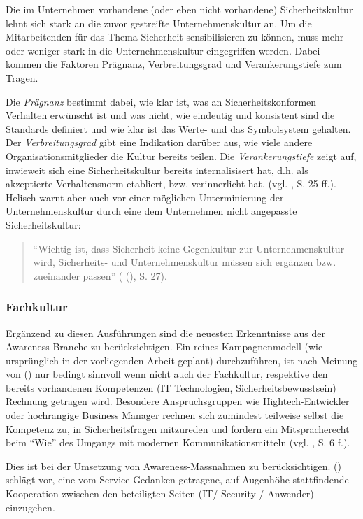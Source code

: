 \documentclass[../../main.tex]{subfiles}
\begin{document}
\begin{sloppypar}
Die im Unternehmen vorhandene (oder eben nicht vorhandene) Sicherheitskultur lehnt sich stark an die zuvor gestreifte Unternehmenskultur an. Um die Mitarbeitenden für das Thema Sicherheit sensibilisieren zu können, muss mehr oder weniger stark in die Unternehmenskultur eingegriffen werden. Dabei kommen die Faktoren Prägnanz, Verbreitungsgrad und Verankerungstiefe zum Tragen.

Die \textit{Prägnanz} bestimmt dabei, wie klar ist, was an Sicherheitskonformen Verhalten erwünscht ist und was nicht, wie eindeutig und konsistent sind die Standards definiert und wie klar ist das Werte- und das Symbolsystem gehalten. Der \textit{Verbreitungsgrad} gibt eine Indikation darüber aus, wie viele andere Organisationsmitglieder die Kultur bereits teilen. Die \textit{Verankerungstiefe} zeigt auf, inwieweit sich eine Sicherheitskultur bereits internalisisert hat, d.h. als akzeptierte Verhaltensnorm etabliert, bzw. verinnerlicht hat. (vgl. \citeauthor{helisch_security_2009} \citeyear{helisch_security_2009}, S. 25 ff.). Helisch warnt aber auch vor einer möglichen Unterminierung der Unternehmenskultur durch eine dem Unternehmen nicht angepasste Sicherheitskultur:

\begin{quote}
"`Wichtig ist, dass Sicherheit keine Gegenkultur zur Unternehmenskultur wird, Sicherheits- und Unternehmenskultur müssen sich ergänzen bzw. zueinander passen"' (\citeauthor{helisch_security_2009} (\citeyear{helisch_security_2009}), S. 27).
\end{quote}

\end{sloppypar}

\subsubsection{Fachkultur}

\begin{sloppypar}
Ergänzend zu diesen Ausführungen sind die neuesten Erkenntnisse aus der Awareness-Branche zu berücksichtigen. Ein reines Kampagnenmodell (wie ursprünglich in der vorliegenden Arbeit geplant) durchzuführen, ist nach Meinung von \citeauthor{wesselmann_awareness:_2016} (\citeyear{wesselmann_awareness:_2016}) nur bedingt sinnvoll wenn nicht auch der Fachkultur, respektive den bereits vorhandenen Kompetenzen (IT Technologien, Sicherheitsbewusstsein) Rechnung getragen wird. Besondere Anspruchsgruppen wie Hightech-Entwickler oder hochrangige Business Manager rechnen sich zumindest teilweise selbst die Kompetenz zu, in Sicherheitsfragen mitzureden und fordern ein Mitspracherecht beim "`Wie"' des Umgangs mit modernen Kommunikationsmitteln (vgl. \citeauthor{wesselmann_awareness:_2016} \citeyear{wesselmann_awareness:_2016}, S. 6 f.).

Dies ist bei der Umsetzung von Awareness-Massnahmen zu berücksichtigen. \citeauthor{wesselmann_awareness:_2016} (\citeyear{wesselmann_awareness:_2016}) schlägt vor, eine vom Service-Gedanken getragene, auf Augenhöhe stattfindende Kooperation zwischen den beteiligten Seiten (IT/ Security / Anwender) einzugehen.
\end{sloppypar}
\end{document}
